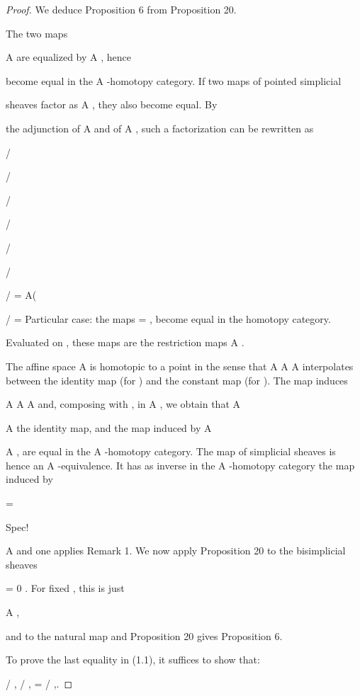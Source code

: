 \documentclass[11pt,a4paper]{article}
\theoremstyle{plain}
\theoremstyle{definition}
\begin{document}
\begin{proof} We deduce Proposition 6 from Proposition 20.


The two maps

 A are equalized by  A
 , hence

become equal in the A -homotopy category. If two maps of pointed simplicial

sheaves 
 factor as 
 A
 , they also become equal. By

the adjunction of A and of  
A  , such a factorization can be
rewritten as

  /

/

/

/

/

/

/
=   A(  

/ =  
Particular case: the maps =   
 , become equal in the homotopy category.

Evaluated on  , these maps are the restriction maps   
   A 
 .

The affine space A is homotopic to a point in the sense that  A  A
A     interpolates between the identity map (for  ) and the constant
map  (for  ). The map  induces



   A 
   A  A 
and, composing with ,  in A , we obtain that
  A

  A
the identity map, and the map induced by 
A




A , are equal in the
A -homotopy category. The map of simplicial sheaves 
  is hence an
A -equivalence. It has as inverse in the A -homotopy category the map induced by

=



 Spec!

A and one applies Remark 1. We now apply Proposition 20 to the
bisimplicial sheaves






=       0 
 . For fixed , this is just 

  A ,

and to the natural map 
and Proposition 20 gives Proposition 6.



To prove the last equality in (1.1), it suffices to show that:

/ , / ,
= / ,.

\end{proof}
\end{document}
